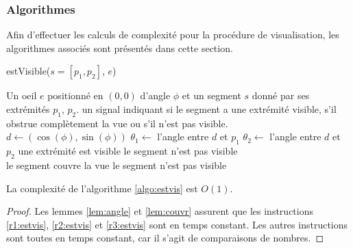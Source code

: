 \subsubsection*{Algorithmes}

Afin d'effectuer les calculs de complexité pour la procédure
de visualisation, les algorithmes associés sont présentés
dans cette section.

\begin{algorithm}
  \caption{estVisible($s=[p_1, p_2]$, $e$)}\label{algo:estvis}
  \begin{algorithmic}[1]
    \REQUIRE Un oeil $e$ positionné en $(0, 0)$ d'angle $\phi$ et un segment $s$
    donné par ses extrémités $p_1$, $p_2$.
    \ENSURE un signal indiquant si le segment a une extrémité visible,
    s'il obstrue complètement la vue ou s'il n'est pas visible.
    \STATE $d\leftarrow (\cos(\phi), \sin(\phi))$
    \STATE $\theta_1\leftarrow$ l'angle entre $d$ et $p_1$ \label{r1:estvis}
    \STATE $\theta_2\leftarrow$ l'angle entre $d$ et $p_2$ \label{r2:estvis}
    \IF{$\theta_1\in[-\pi/4, \pi/4]\lor \theta_2\in[-\pi/4, \pi/4]$}
    \RETURN \og{}une extrémité est visible\fg{}
    \RETURN \og le segment n'est pas visible \fg \\
     \label{r3:estvis}
    \RETURN \og le segment couvre la vue\fg
    \ELSE
    \RETURN \og le segment n'est pas visible \fg
    \ENDIF
  \end{algorithmic}
\end{algorithm}

\begin{prop}
  La complexité de l'algorithme \ref{algo:estvis} est $O(1)$.
\end{prop}
\begin{proof}
  Les lemmes \ref{lem:angle} et \ref{lem:couvr} assurent que
  les instructions \ref{r1:estvis}, \ref{r2:estvis} et \ref{r3:estvis} sont en temps
  constant. Les autres instructions sont toutes en temps constant, car il s'agit
  de comparaisons de nombres.
\end{proof}

